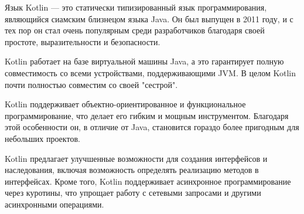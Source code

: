 Язык Kotlin --– это статически типизированный язык программирования, являющийся сиамским близнецом языка Java. Он был выпущен в 2011 году, и с тех пор он стал очень популярным среди разработчиков благодаря своей простоте, выразительности и безопасности.

Kotlin работает на базе виртуальной машины Java, а это гарантирует полную совместимость со всеми устройствами, поддерживающими JVM. В целом Kotlin почти полностью совместим со своей "сестрой".

Kotlin поддерживает объектно-ориентированное и функциональное программирование, что делает его гибким и мощным инструментом. Благодаря этой особенности он, в отличие от Java, становится гораздо более пригодным для небольших проектов.

Kotlin предлагает улучшенные возможности для создания интерфейсов и наследования, включая возможность определять реализацию методов в интерфейсах. Кроме того, Kotlin поддерживает асинхронное программирование через куротины, что упрощает работу с сетевыми запросами и другими асинхронными операциями.